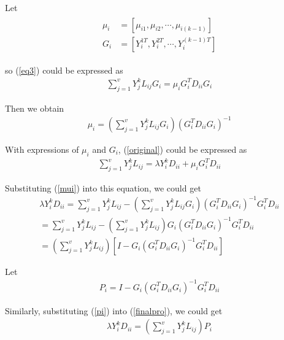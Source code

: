 \documentclass[journal]{IEEEtran}
\begin{document}
Let
\begin{align}
\begin{split}
\mu_i &= [\mu_{i1}, \mu_{i2}, \cdots, \mu_{i(k-1)} ]\\
G_i& = [Y_i^{1T}, Y_i^{2T}, \cdots, Y_i^{(k-1)T}] 
\end{split}
\end{align}

so (\ref{eq3}) could be expressed as
\begin{gather}
\sum_{j=1}^v Y_j^{k}{L_{ij}} G_i=\mu_iG_i^T{D_{ii}}G_i
\end{gather}

Then we obtain
\begin{gather}
\mu_i=(\sum_{j=1}^v Y_j^{k}{L_{ij}} G_i)(G_i^T{D_{ii}}G_i)^{-1}
\label{mui}
\end{gather}

With expressions of $\mu_i$ and $G_i$, (\ref{original}) could be expressed as
\begin{gather}
\sum_{j=1}^v Y_j^{k}{L_{ij}}=\lambda  Y_i^k{D_{ii}}+\mu_iG_i^T{D_{ii}}
\end{gather}

Substituting (\ref{mui}) into this equation, we could get
\begin{gather}
\lambda Y_i^k{D_{ii}}=\sum_{j=1}^v Y_j^{k}{L_{ij}}-
(\sum_{j=1}^v Y_j^{k}{L_{ij}} G_i)(G_i^T{D_{ii}}G_i)^{-1}G_i^T{D_{ii}} \nonumber \\
\label{finalpro}
=\sum_{j=1}^v Y_j^{k}{L_{ij}}-
(\sum_{j=1}^v Y_j^{k}{L_{ij}}) G_i(G_i^T{D_{ii}}G_i)^{-1}G_i^T{D_{ii}} \\
= (\sum_{j=1}^v Y_j^{k}{L_{ij}})[I-G_i(G_i^T{D_{ii}}G_i)^{-1}G_i^T{D_{ii}} ] \nonumber
\end{gather}

Let
\begin{gather}
P_i=I-G_i(G_i^T{D_{ii}}G_i)^{-1}G_i^T{D_{ii}} 
\label{pi}
\end{gather}

Similarly, substituting (\ref{pi}) into (\ref{finalpro}), we could get
\begin{gather}
\lambda Y_i^k{D_{ii}}= (\sum_{j=1}^v Y_j^{k}{L_{ij}})P_i
\end{gather}
\end{document}
